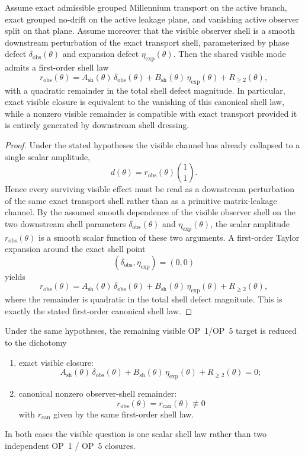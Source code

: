 \begin{theorem}
Assume exact admissible grouped Millennium transport on the active branch, exact grouped no-drift on the active leakage plane, and vanishing active observer split on that plane. Assume moreover that the visible observer shell is a smooth downstream perturbation of the exact transport shell, parameterized by phase defect $\delta_{\mathrm{obs}}(\theta)$ and expansion defect $\eta_{\mathrm{exp}}(\theta)$. Then the shared visible mode admits a first-order shell law
\[
  r_{\mathrm{obs}}(\theta)
  =A_{\mathrm{sh}}(\theta)\,\delta_{\mathrm{obs}}(\theta)
  +B_{\mathrm{sh}}(\theta)\,\eta_{\mathrm{exp}}(\theta)
  +R_{\ge 2}(\theta),
\]
with a quadratic remainder in the total shell defect magnitude. In particular, exact visible closure is equivalent to the vanishing of this canonical shell law, while a nonzero visible remainder is compatible with exact transport provided it is entirely generated by downstream shell dressing.
\end{theorem}

\begin{proof}
Under the stated hypotheses the visible channel has already collapsed to a single scalar amplitude,
\[
  d(\theta)=r_{\mathrm{obs}}(\theta)\binom{1}{1}.
\]
Hence every surviving visible effect must be read as a downstream perturbation of the same exact transport shell rather than as a primitive matrix-leakage channel. By the assumed smooth dependence of the visible observer shell on the two downstream shell parameters $\delta_{\mathrm{obs}}(\theta)$ and $\eta_{\mathrm{exp}}(\theta)$, the scalar amplitude $r_{\mathrm{obs}}(\theta)$ is a smooth scalar function of these two arguments. A first-order Taylor expansion around the exact shell point
\[
  (\delta_{\mathrm{obs}},\eta_{\mathrm{exp}})=(0,0)
\]
yields
\[
  r_{\mathrm{obs}}(\theta)
  =A_{\mathrm{sh}}(\theta)\,\delta_{\mathrm{obs}}(\theta)
  +B_{\mathrm{sh}}(\theta)\,\eta_{\mathrm{exp}}(\theta)
  +R_{\ge 2}(\theta),
\]
where the remainder is quadratic in the total shell defect magnitude. This is exactly the stated first-order canonical shell law.
\end{proof}

\begin{corollary}
Under the same hypotheses, the remaining visible OP~1/OP~5 target is reduced to the dichotomy
\begin{enumerate}[leftmargin=2em,label=(\roman*)]
\item exact visible closure:
\[
  A_{\mathrm{sh}}(\theta)\,\delta_{\mathrm{obs}}(\theta)
  +B_{\mathrm{sh}}(\theta)\,\eta_{\mathrm{exp}}(\theta)
  +R_{\ge 2}(\theta)=0;
\]
\item canonical nonzero observer-shell remainder:
\[
  r_{\mathrm{obs}}(\theta)=r_{\mathrm{can}}(\theta)
  \not\equiv 0
\]
with $r_{\mathrm{can}}$ given by the same first-order shell law.
\end{enumerate}
In both cases the visible question is one scalar shell law rather than two independent OP~1 / OP~5 closures.
\end{corollary}

